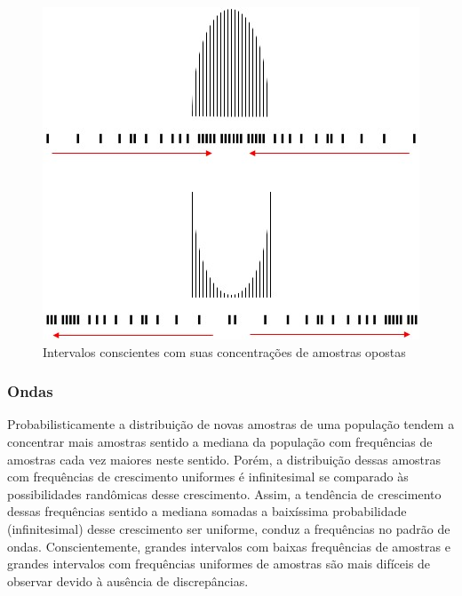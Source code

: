 \begin{figure}[H]
\caption{Intervalos conscientes com suas concentrações de amostras opostas}
\label{fig:consciousness_concentration_of_opposite_samples_within_range}
\centering
\includegraphics[scale=.8]{sections/images/consciousness_concentration_of_opposite_samples_within_range.jpg}
\end{figure}

\subsubsection{Ondas}
Probabilisticamente a distribuição de novas amostras de uma população tendem a concentrar mais amostras sentido a mediana da população com frequências de amostras cada vez maiores neste sentido. Porém, a distribuição dessas amostras com frequências de crescimento uniformes é infinitesimal se comparado às possibilidades randômicas desse crescimento. Assim, a tendência de crescimento dessas frequências sentido a mediana somadas a baixíssima probabilidade (infinitesimal) desse crescimento ser uniforme, conduz a frequências no padrão de ondas. Conscientemente, grandes intervalos com baixas frequências de amostras e grandes intervalos com frequências uniformes de amostras são mais difíceis de observar devido à ausência de discrepâncias.

